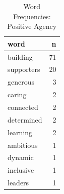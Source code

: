 \begin{table}[ht]
\centering
\begin{tabular}{lr}
  \hline
word & n \\ 
  \hline
building &  71 \\ 
  supporters &  20 \\ 
  generous &   3 \\ 
  caring &   2 \\ 
  connected &   2 \\ 
  determined &   2 \\ 
  learning &   2 \\ 
  ambitious &   1 \\ 
  dynamic &   1 \\ 
  inclusive &   1 \\ 
  leaders &   1 \\ 
   \hline
\end{tabular}
\caption{Word Frequencies: Positive Agency} 
\end{table}
